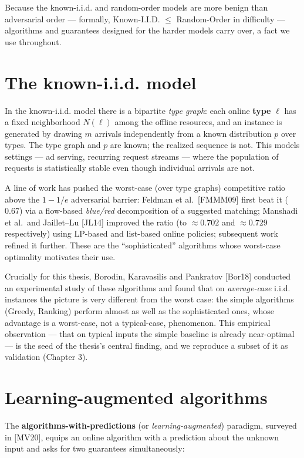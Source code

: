 Because the known-i.i.d. and random-order models are more benign than adversarial order ---
formally, Known-I.I.D. \(\le\) Random-Order in difficulty --- algorithms and guarantees
designed for the harder models carry over, a fact we use throughout.

\section{The known-i.i.d. model}\label{the-known-i.i.d.-model}

In the known-i.i.d. model there is a bipartite \emph{type graph}: each online \textbf{type} \(\ell\)
has a fixed neighborhood \(N(\ell)\) among the offline resources, and an instance is generated
by drawing \(m\) arrivals independently from a known distribution \(p\) over types. The type
graph and \(p\) are known; the realized sequence is not. This models settings --- ad serving,
recurring request streams --- where the population of requests is statistically stable even
though individual arrivals are not.

A line of work has pushed the worst-case (over type graphs) competitive ratio above the
\(1-1/e\) adversarial barrier: Feldman et al.~{[}FMMM09{]} first beat it (\(0.67\)) via a
flow-based \emph{blue/red} decomposition of a suggested matching; Manshadi et al.~and Jaillet--Lu
{[}JL14{]} improved the ratio (to \(\approx0.702\) and \(\approx0.729\) respectively) using
LP-based and list-based online policies; subsequent work refined it further. These are the
``sophisticated'' algorithms whose worst-case optimality motivates their use.

Crucially for this thesis, Borodin, Karavasilis and Pankratov {[}Bor18{]} conducted an
experimental study of these algorithms and found that on \emph{average-case} i.i.d. instances
the picture is very different from the worst case: the simple algorithms (Greedy, Ranking)
perform almost as well as the sophisticated ones, whose advantage is a worst-case, not a
typical-case, phenomenon. This empirical observation --- that on typical inputs the simple
baseline is already near-optimal --- is the seed of the thesis's central finding, and we
reproduce a subset of it as validation (Chapter 3).

\section{Learning-augmented algorithms}\label{learning-augmented-algorithms}

The \textbf{algorithms-with-predictions} (or \emph{learning-augmented}) paradigm, surveyed in
{[}MV20{]}, equips an online algorithm with a prediction about the unknown input and asks for
two guarantees simultaneously:

